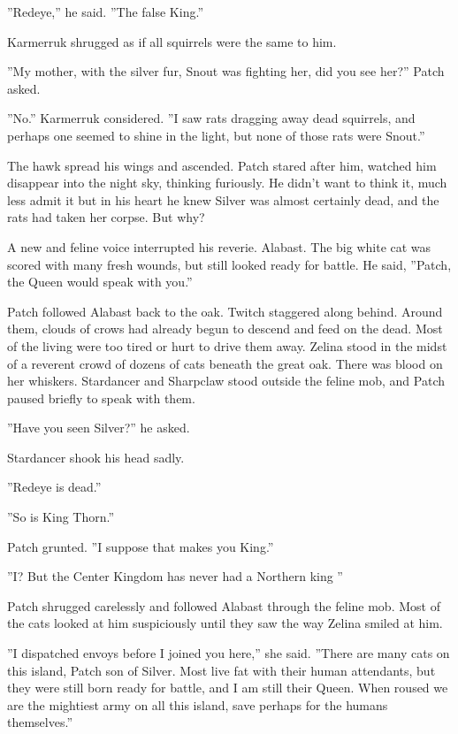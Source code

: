 \documentclass[12pt]{book}
\begin{document}
''Redeye,'' he said. ''The false King.''

Karmerruk shrugged as if all squirrels were the same to him.

''My mother, with the silver fur, Snout was fighting her, did you see her?'' Patch asked.

''No.'' Karmerruk considered. ''I saw rats dragging away dead squirrels, and perhaps one seemed to shine in the light, but none of those rats were Snout.''

The hawk spread his wings and ascended. Patch stared after him, watched him disappear into the night sky, thinking furiously. He didn't want to think it, much less admit it %
but in his heart he knew Silver was almost certainly dead, and the rats had taken her corpse. But why?

A new and feline voice interrupted his reverie. Alabast. The big white cat was scored with many fresh wounds, but still looked ready for battle. He said, ''Patch, the Queen would speak with you.''

Patch followed Alabast back to the oak. Twitch staggered along behind. Around them, clouds of crows had already begun to descend and feed on the dead. Most of the living were too tired or hurt to drive them away. Zelina stood in the midst of a reverent crowd of dozens of cats beneath the great oak. There was blood on her whiskers. Stardancer and Sharpclaw stood outside the feline mob, and Patch paused briefly to speak with them.

''Have you seen Silver?'' he asked.

Stardancer shook his head sadly.

''Redeye is dead.''

''So is King Thorn.''

Patch grunted. ''I suppose that makes you King.''

''I? But %
the Center Kingdom has never had a Northern king %
''

Patch shrugged carelessly and followed Alabast through the feline mob. Most of the cats looked at him suspiciously until they saw the way Zelina smiled at him.

''I dispatched envoys before I joined you here,'' she said. ''There are many cats on this island, Patch son of Silver. Most live fat with their human attendants, but they were still born ready for battle, and I am still their Queen. When roused we are the mightiest army on all this island, save perhaps for the humans themselves.''
\end{document}
